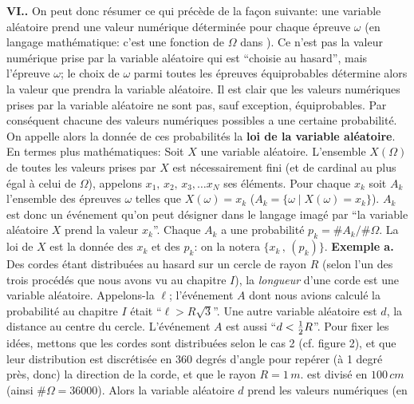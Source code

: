 {\bf VI..  }  
\medskip
On peut donc r\'esumer ce qui pr\'ec\`ede de la fa\c{c}on suivante: une 
variable al\'eatoire prend une valeur num\'erique d\'etermin\'ee pour
chaque \'epreuve $\omega$ (en langage math\'ematique: c'est une 
fonction de $\Omega$ dans \R ). Ce n'est pas la valeur num\'erique prise
par la variable al\'eatoire qui est ``choisie au hasard'', mais l'\'epreuve
$\omega$;  le choix de $\omega$ parmi toutes les \'epreuves
\'equiprobables d\'etermine alors la valeur que prendra la variable
al\'eatoire. Il est clair que les valeurs num\'eriques prises par la 
variable al\'eatoire ne sont pas, sauf exception, \'equiprobables. Par
cons\'equent chacune des valeurs num\'eriques possibles a une certaine
probabilit\'e.  On appelle alors la donn\'ee de ces probabilit\'es la {\bf 
loi de la variable al\'eatoire}. En termes plus math\'ematiques: 
\medskip
{\narrower Soit $X$ une variable al\'eatoire. L'ensemble $X(\Omega )$ 
de toutes les valeurs prises par $X$ est n\'ecessairement fini (et de
cardinal au plus \'egal \`a celui de $\Omega$), appelons $x_1, \, x_2, \,
x_3, \ldots x_N$ ses \'el\'ements. Pour chaque $x_k$ soit $A_k$
l'ensemble des  \'epreuves $\omega$ telles que $X(\omega ) = x_k$ ($A_k
= \{ \omega  \mid X(\omega ) = x_k \}$). $A_k$ est donc un \'ev\'enement
qu'on peut d\'esigner dans le langage imag\'e par ``la variable al\'eatoire
$X$ prend  la valeur $x_k$''. Chaque $A_k$ a une probabilit\'e $p_k = \#
A_k / \#\Omega$. La loi de $X$ est la donn\'ee des $x_k$ et des $p_k$:
on la notera $\{ x_k\,  ,\, (p_k)\}$.}
\medskip 
{\bf Exemple a.}\hskip5pt Des cordes \'etant distribu\'ees au hasard sur 
un cercle  de rayon $R$ (selon l'un des trois proc\'ed\'es que nous avons
vu au chapitre $I$), la  {\it longueur}  d'une corde est une variable
al\'eatoire. Appelons-la  $\ell$; l'\'ev\'enement $A$ dont nous avions
calcul\'e la probabilit\'e au chapitre $I$ \'etait ``$\ell > R\sqrt{3}$''.  
Une
autre variable al\'eatoire est $d$, la distance au centre du cercle.
L'\'ev\'enement $A$ est aussi ``$d < {1 \over 2}R$''. Pour fixer les id\'ees,
mettons que les cordes sont distribu\'ees selon le cas 2 (cf. figure 2), et
que leur distribution est discr\'etis\'ee en 360 degr\'es d'angle pour
rep\'erer (\`a 1 degr\'e pr\`es, donc) la direction de la corde, et que le
rayon $R = 1\, m.$ est divis\'e en $100\, cm$ (ainsi $\#\Omega = 36000$).
Alors la variable al\'eatoire $d$ prend les valeurs num\'eriques (en
